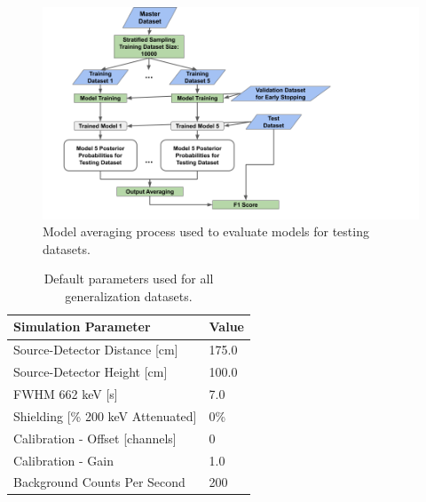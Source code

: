 \begin{figure}[H]
	\centering
	\includegraphics[trim=0 0 210 0,clip,width=1.0\linewidth]{images/generalization_performance_diagram}
	\caption{Model averaging process used to evaluate models for testing datasets.}
	\label{fig:generalization_performance_diagram}
\end{figure}

\begin{table}[H]
\centering
\caption{Default parameters used for all generalization datasets.}
\label{table:default_sim_params}
\begin{tabular}{ll}
\hline
\textbf{Simulation Parameter} &  \textbf{Value} \\ \hline
Source-Detector Distance [cm] & 175.0\\ 
Source-Detector Height [cm] & 100.0\\ 
FWHM 662 keV [s] & 7.0\\ 
Shielding [\% 200 keV Attenuated] & 0\% \\ 
Calibration - Offset [channels] & 0 \\ 
Calibration - Gain & 1.0 \\ 
Background Counts Per Second & 200 \\ \hline 
\end{tabular}
\end{table}



